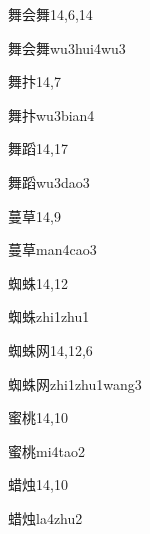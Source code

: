 \begin{entry}{舞会舞}{14,6,14}
  \begin{phonetics}{舞会舞}{wu3hui4wu3}
  \end{phonetics}
\end{entry}

\begin{entry}{舞抃}{14,7}
  \begin{phonetics}{舞抃}{wu3bian4}
  \end{phonetics}
\end{entry}

\begin{entry}{舞蹈}{14,17}
  \begin{phonetics}{舞蹈}{wu3dao3}
  \end{phonetics}
\end{entry}

\begin{entry}{蔓草}{14,9}
  \begin{phonetics}{蔓草}{man4cao3}
  \end{phonetics}
\end{entry}

\begin{entry}{蜘蛛}{14,12}
  \begin{phonetics}{蜘蛛}{zhi1zhu1}
  \end{phonetics}
\end{entry}

\begin{entry}{蜘蛛网}{14,12,6}
  \begin{phonetics}{蜘蛛网}{zhi1zhu1wang3}
  \end{phonetics}
\end{entry}

\begin{entry}{蜜桃}{14,10}
  \begin{phonetics}{蜜桃}{mi4tao2}
  \end{phonetics}
\end{entry}

\begin{entry}{蜡烛}{14,10}
  \begin{phonetics}{蜡烛}{la4zhu2}
  \end{phonetics}
\end{entry}

